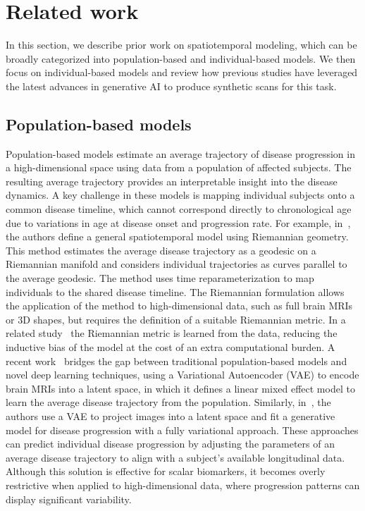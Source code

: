 \section{Related work}
In this section, we describe prior work on spatiotemporal modeling, which can be broadly categorized into population-based and individual-based models. We then focus on individual-based models and review how previous studies have leveraged the latest advances in generative AI to produce synthetic scans for this task. 

\subsection{Population-based models}
Population-based models estimate an average trajectory of disease progression in a high-dimensional space using data from a population of affected subjects. The resulting average trajectory provides an interpretable insight into the disease dynamics. A key challenge in these models is mapping individual subjects onto a common disease timeline, which cannot correspond directly to chronological age due to variations in age at disease onset and progression rate. For example, in~\citep{schiratti2015learning}, the authors define a general spatiotemporal model using Riemannian geometry. This method estimates the average disease trajectory as a geodesic on a Riemannian manifold and considers individual trajectories as curves parallel to the average geodesic. The method uses time reparameterization to map individuals to the shared disease timeline. The Riemannian formulation allows the application of the method to high-dimensional data, such as full brain MRIs or 3D shapes, but requires the definition of a suitable Riemannian metric. In a related study~\citep{sauty2022riemannian} the Riemannian metric is learned from the data, reducing the inductive bias of the model at the cost of an extra computational burden. A recent work~\citep{sauty2022progression} bridges the gap between traditional population-based models and novel deep learning techniques, using a Variational Autoencoder (VAE) to encode brain MRIs into a latent space, in which it defines a linear mixed effect model to learn the average disease trajectory from the population. Similarly, in~\citep{chadebec2022image}, the authors use a VAE to project images into a latent space and fit a generative model for disease progression with a fully variational approach. These approaches can predict individual disease progression by adjusting the parameters of an average disease trajectory to align with a subject's available longitudinal data. Although this solution is effective for scalar biomarkers, it becomes overly restrictive when applied to high-dimensional data, where progression patterns can display significant variability.


